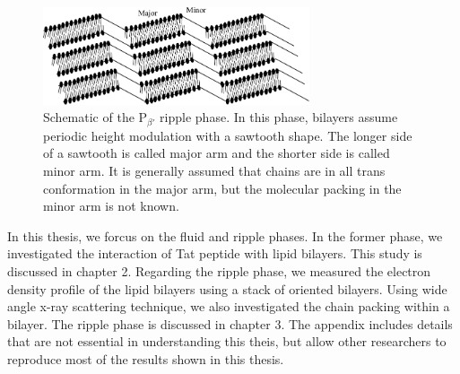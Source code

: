 \begin{figure}[htbp]
  \centering
  \includegraphics[width=0.7\textwidth]{figures/ripple/ripple_cartoon}
  \caption{Schematic of the P$_{\beta'}$ ripple phase. In this phase, 
  bilayers assume periodic height modulation with a sawtooth shape.
  The longer side of a sawtooth is called major arm and the shorter
  side is called minor arm. It is generally assumed that chains are
  in all trans conformation in the major arm, but the molecular packing
  in the minor arm is not known.}
  \label{fig:ripple_cartoon}
\end{figure}


In this thesis, we forcus on the fluid and ripple phases. In the former phase,
we investigated the interaction of Tat peptide with lipid bilayers. 
This study is discussed in chapter 2.
Regarding the ripple phase, we measured the electron density profile of the lipid
bilayers using a stack of oriented bilayers. Using wide angle x-ray scattering
technique, we also investigated the chain packing within a bilayer. 
The ripple phase is discussed in chapter 3. 
The appendix includes details that are not essential in understanding this
theis, but allow other researchers to reproduce most of the results shown in 
this thesis.